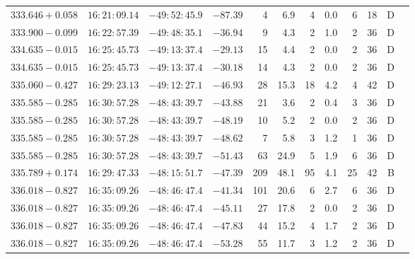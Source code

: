 {\begin{longtable}{c rrr rrrrr rr c}
    $333.646+0.058$     &   $16:21:09.14$     &   $-49:52:45.9$     &   $-87.39  $    &   4      &    6.9    &    4   &   0.0 &   6   &   18  &   D   \\
    $333.900-0.099$     &   $16:22:57.39$     &   $-49:48:35.1$     &   $-36.94  $    &   9      &    4.3    &    2   &   1.0 &   2   &   36  &   D   \\
    $334.635-0.015$     &   $16:25:45.73$     &   $-49:13:37.4$     &   $-29.13  $    &   15     &    4.4    &    2   &   0.0 &   2   &   36  &   D   \\
    $334.635-0.015$     &   $16:25:45.73$     &   $-49:13:37.4$     &   $-30.18  $    &   14     &    4.3    &    2   &   0.0 &   2   &   36  &   D   \\
    $335.060-0.427$     &   $16:29:23.13$     &   $-49:12:27.1$     &   $-46.93  $    &   28     &   15.3    &    18  &   4.2 &   4   &   42  &   D   \\
    $335.585-0.285$     &   $16:30:57.28$     &   $-48:43:39.7$     &   $-43.88  $    &   21     &    3.6    &    2   &   0.4 &   3   &   36  &   D   \\
    $335.585-0.285$     &   $16:30:57.28$     &   $-48:43:39.7$     &   $-48.19  $    &   10     &    5.2    &    2   &   0.0 &   2   &   36  &   D   \\
    $335.585-0.285$     &   $16:30:57.28$     &   $-48:43:39.7$     &   $-48.62  $    &   7      &    5.8    &    3   &   1.2 &   1   &   36  &   D   \\
    $335.585-0.285$     &   $16:30:57.28$     &   $-48:43:39.7$     &   $-51.43  $    &   63     &   24.9    &    5   &   1.9 &   6   &   36  &   D   \\
    $335.789+0.174$     &   $16:29:47.33$     &   $-48:15:51.7$     &   $-47.39  $    &   209    &   48.1    &    95  &   4.1 &   25  &   42  &   B   \\
    $336.018-0.827$     &   $16:35:09.26$     &   $-48:46:47.4$     &   $-41.34  $    &   101    &   20.6    &    6   &   2.7 &   6   &   36  &   D   \\
    $336.018-0.827$     &   $16:35:09.26$     &   $-48:46:47.4$     &   $-45.11  $    &   27     &   17.8    &    2   &   0.0 &   2   &   36  &   D   \\
    $336.018-0.827$     &   $16:35:09.26$     &   $-48:46:47.4$     &   $-47.83  $    &   44     &   15.2    &    4   &   1.7 &   2   &   36  &   D   \\
    $336.018-0.827$     &   $16:35:09.26$     &   $-48:46:47.4$     &   $-53.28  $    &   55     &   11.7    &    3   &   1.2 &   2   &   36  &   D   \\

\end{longtable}}
